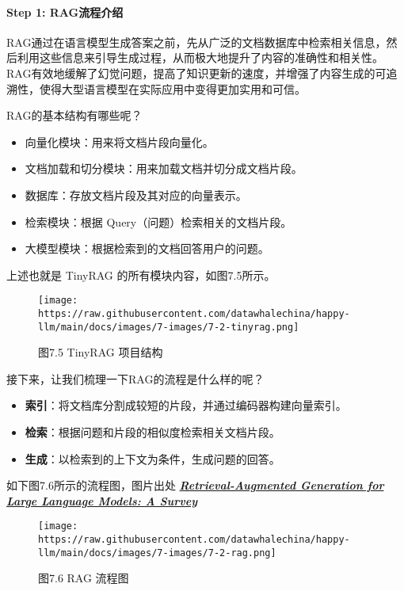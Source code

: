 \documentclass[
]{article}
\providecommand{\tightlist}{%
  \setlength{\itemsep}{0pt}\setlength{\parskip}{0pt}}
\begin{document}
\paragraph{Step 1:
RAG流程介绍}\label{step-1-ragux6d41ux7a0bux4ecbux7ecd}

RAG通过在语言模型生成答案之前，先从广泛的文档数据库中检索相关信息，然后利用这些信息来引导生成过程，从而极大地提升了内容的准确性和相关性。RAG有效地缓解了幻觉问题，提高了知识更新的速度，并增强了内容生成的可追溯性，使得大型语言模型在实际应用中变得更加实用和可信。

RAG的基本结构有哪些呢？

\begin{itemize}
\tightlist
\item
  向量化模块：用来将文档片段向量化。
\item
  文档加载和切分模块：用来加载文档并切分成文档片段。
\item
  数据库：存放文档片段及其对应的向量表示。
\item
  检索模块：根据 Query（问题）检索相关的文档片段。
\item
  大模型模块：根据检索到的文档回答用户的问题。
\end{itemize}

上述也就是 TinyRAG 的所有模块内容，如图7.5所示。

\begin{figure}[htbp]\centering
\texttt{[image: https://raw.githubusercontent.com/datawhalechina/happy-llm/main/docs/images/7-images/7-2-tinyrag.png]}
\caption{图7.5 TinyRAG 项目结构}
\end{figure}

接下来，让我们梳理一下RAG的流程是什么样的呢？

\begin{itemize}
\tightlist
\item
  \textbf{索引}：将文档库分割成较短的片段，并通过编码器构建向量索引。
\item
  \textbf{检索}：根据问题和片段的相似度检索相关文档片段。
\item
  \textbf{生成}：以检索到的上下文为条件，生成问题的回答。
\end{itemize}

如下图7.6所示的流程图，图片出处
\textbf{\emph{\href{https://arxiv.org/pdf/2312.10997.pdf}{Retrieval-Augmented
Generation for Large Language Models: A Survey}}}

\begin{figure}[htbp]\centering
\texttt{[image: https://raw.githubusercontent.com/datawhalechina/happy-llm/main/docs/images/7-images/7-2-rag.png]}
\caption{图7.6 RAG 流程图}
\end{figure}
\end{document}
